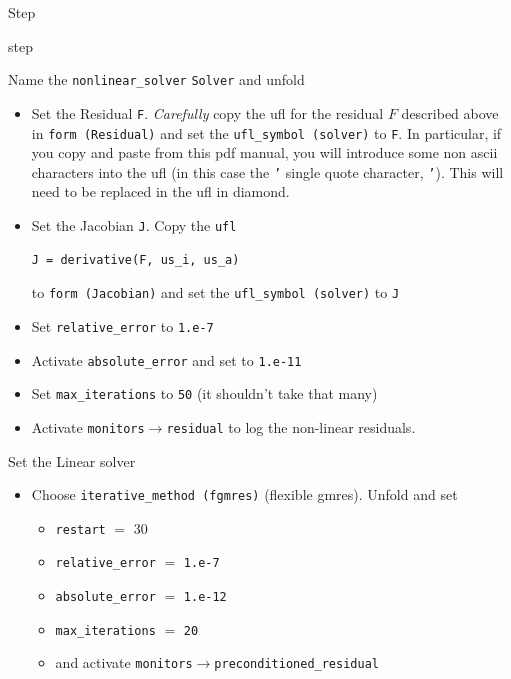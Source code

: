 \begin{steps}{Step}
\begin{steps}{step}
\begin{itemize}
    \end{itemize}
  \item Name the \texttt{nonlinear\_solver} \texttt{Solver} and unfold
    \begin{itemize}
    \item Set the Residual \texttt{F}.  \emph{Carefully} copy the ufl for the
      residual $F$ described
      above in \texttt{form (Residual)} and set the
      \texttt{ufl\_symbol (solver)} to \texttt{F}.  In particular, if
      you copy and paste from this pdf manual, you will introduce some
      non ascii characters into the ufl (in this case the \texttt{'}
      single quote character,  \texttt{'}).  This will need to be
      replaced in the ufl in diamond.
    \item Set the Jacobian \texttt{J}.  Copy the \texttt{ufl}
      \begin{lstlisting}[style=UFL]
        J = derivative(F, us_i, us_a)
      \end{lstlisting}
      to \texttt{form (Jacobian)} and set the \texttt{ufl\_symbol
        (solver)} to \texttt{J}
    \item Set \texttt{relative\_error} to \texttt{1.e-7}
    \item Activate \texttt{absolute\_error} and set to \texttt{1.e-11}
    \item Set \texttt{max\_iterations} to \texttt{50} (it shouldn't
      take that many)
    \item Activate \texttt{monitors}$\rightarrow$\texttt{residual} to
      log the non-linear residuals.
    \end{itemize}
  \item Set the Linear solver
    \begin{itemize}
    \item Choose \texttt{iterative\_method (fgmres)} (flexible
      gmres). Unfold and set
      \begin{itemize}
      \item \texttt{restart} $=$ 30
      \item \texttt{relative\_error} $=$ \texttt{1.e-7}
      \item \texttt{absolute\_error} $=$  \texttt{1.e-12}
      \item \texttt{max\_iterations} $=$  \texttt{20}
      \item and activate \texttt{monitors}$\rightarrow$\texttt{preconditioned\_residual}
      \end{itemize}


\end{itemize}
\end{steps}
\end{steps}
